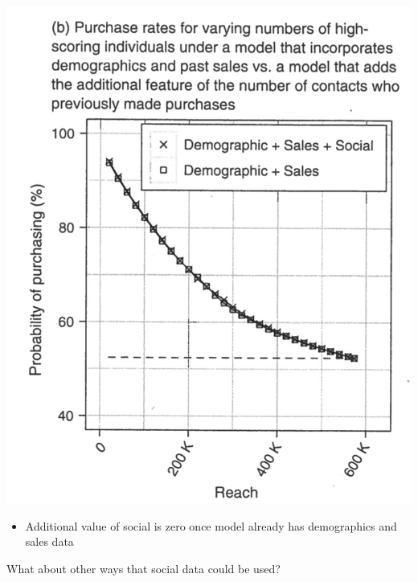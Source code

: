 \documentclass[aspectratio=169]{beamer}
\begin{document}
\begin{frame}

\begin{center}
\includegraphics[height=0.8\textheight]{figures/goel_predicting_2014_fig8b}
\end{center}

\vfill

\begin{itemize}
\item Additional value of social is zero once model already has demographics and sales data
\end{itemize}

\end{frame}
\begin{frame}

What about other ways that social data could be used?

\end{frame}
\end{document}
